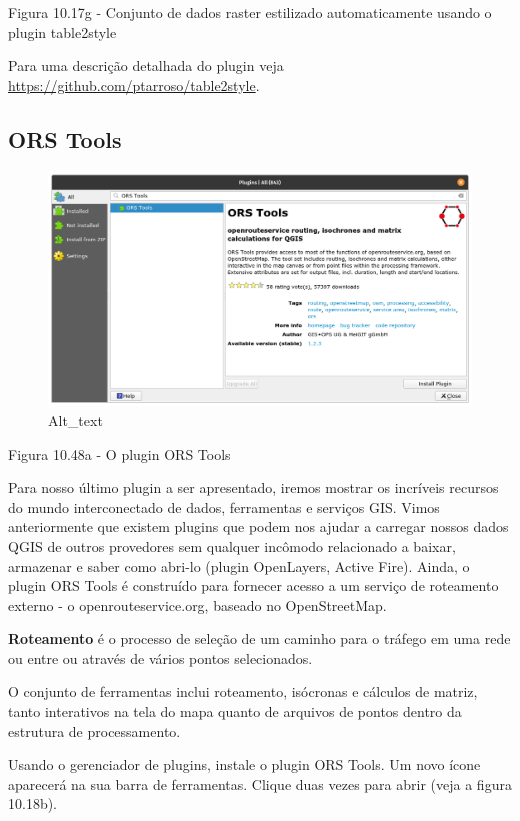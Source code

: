\documentclass[
  portuguese,
]{krantz}
\begin{document}
Figura 10.17g - Conjunto de dados raster estilizado automaticamente usando o plugin table2style

Para uma descrição detalhada do plugin veja \url{https://github.com/ptarroso/table2style}.

\hypertarget{ors-tools}{%
\subsection{\texorpdfstring{\textbf{ORS Tools}}{ORS Tools}}\label{ors-tools}}

\begin{figure}
\centering
\includegraphics{media/modulo10/fig1018_a.png}
\caption{Alt\_text}
\end{figure}

Figura 10.48a - O plugin ORS Tools

Para nosso último plugin a ser apresentado, iremos mostrar os incríveis recursos do mundo interconectado de dados, ferramentas e serviços GIS. Vimos anteriormente que existem plugins que podem nos ajudar a carregar nossos dados QGIS de outros provedores sem qualquer incômodo relacionado a baixar, armazenar e saber como abri-lo (plugin OpenLayers, Active Fire). Ainda, o plugin ORS Tools é construído para fornecer acesso a um serviço de roteamento externo - o openrouteservice.org, baseado no OpenStreetMap.

\textbf{Roteamento} é o processo de seleção de um caminho para o tráfego em uma rede ou entre ou através de vários pontos selecionados.

O conjunto de ferramentas inclui roteamento, isócronas e cálculos de matriz, tanto interativos na tela do mapa quanto de arquivos de pontos dentro da estrutura de processamento.

Usando o gerenciador de plugins, instale o plugin ORS Tools. Um novo ícone aparecerá na sua barra de ferramentas. Clique duas vezes para abrir (veja a figura 10.18b).
\end{document}
